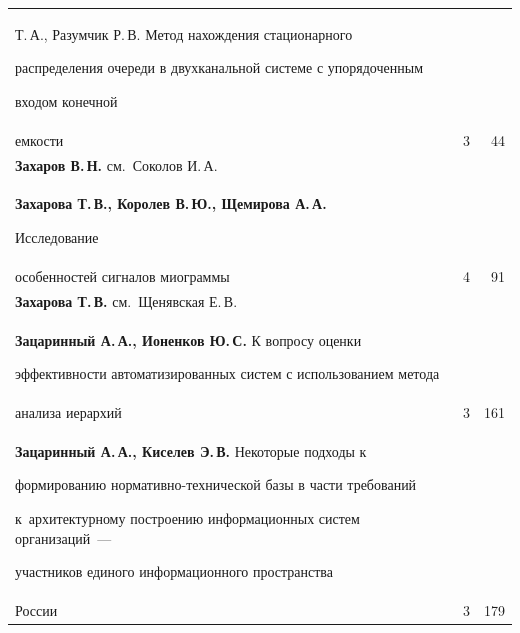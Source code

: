 {\begin{tabular}{p{317.5pt}rr}
{Т.\,А., Разумчик Р.\,В.} Метод нахождения стационарного


распределения очереди в двухканальной системе с упорядоченным


входом конечной\linebreak


\\[-12pt]


\hspace*{21pt}емкости&3&44\\


\textbf{Захаров В.\,Н.} см.\ Соколов И.\,А.&&\\


\textbf{Захарова Т.\,В., Королев В.\,Ю., Щемирова А.\,А.}


Исследование\linebreak


\\[-12pt]


\hspace*{21pt}особенностей сигналов миограммы&4&91\\


\textbf{Захарова Т.\,В.} см.\ Щенявская Е.\,В.&&\\


\hangindent=21pt\noindent\textbf{Зацаринный А.\,А., Ионенков Ю.\,С.} К вопросу оценки


эффективности автоматизированных систем с использованием метода\linebreak


\\[-12pt]


\hspace*{21pt}анализа иерархий&3&161\\


\hangindent=21pt\noindent\textbf{Зацаринный А.\,А., Киселев Э.\,В.} Некоторые подходы к


формированию нормативно-технической базы в части требований 


к~архитектурному построению информационных систем организаций~---


участников единого информационного пространства\linebreak


\\[-12pt]


\hspace*{21pt}России&3&179\\


\end{tabular}


}



